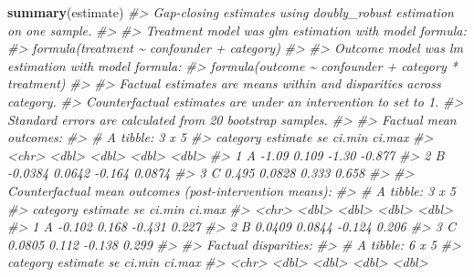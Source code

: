 \documentclass[
]{article}
\newenvironment{Shaded}{\begin{snugshade}}{\end{snugshade}}
\newcommand{\CommentTok}[1]{\textcolor[rgb]{0.56,0.35,0.01}{\textit{#1}}}
\newcommand{\FunctionTok}[1]{\textcolor[rgb]{0.13,0.29,0.53}{\textbf{#1}}}
\newcommand{\NormalTok}[1]{#1}
\begin{document}
\begin{Shaded}
\begin{Highlighting}[]
\FunctionTok{summary}\NormalTok{(estimate)}
\CommentTok{\#\textgreater{} Gap{-}closing estimates using doubly\_robust estimation on one sample.}
\CommentTok{\#\textgreater{} }
\CommentTok{\#\textgreater{} Treatment model was glm estimation with model formula:}
\CommentTok{\#\textgreater{} formula(treatment \textasciitilde{} confounder + category)}
\CommentTok{\#\textgreater{} }
\CommentTok{\#\textgreater{} Outcome model was lm estimation with model formula:}
\CommentTok{\#\textgreater{} formula(outcome \textasciitilde{} confounder + category * treatment)}
\CommentTok{\#\textgreater{} }
\CommentTok{\#\textgreater{} Factual estimates are means within and disparities across category.}
\CommentTok{\#\textgreater{} Counterfactual estimates are under an intervention to set  to 1.}
\CommentTok{\#\textgreater{} Standard errors are calculated from 20 bootstrap samples.}
\CommentTok{\#\textgreater{} }
\CommentTok{\#\textgreater{} Factual mean outcomes:}
\CommentTok{\#\textgreater{} \# A tibble: 3 x 5}
\CommentTok{\#\textgreater{}   category estimate     se ci.min  ci.max}
\CommentTok{\#\textgreater{}   \textless{}chr\textgreater{}       \textless{}dbl\textgreater{}  \textless{}dbl\textgreater{}  \textless{}dbl\textgreater{}   \textless{}dbl\textgreater{}}
\CommentTok{\#\textgreater{} 1 A         {-}1.09   0.109  {-}1.30  {-}0.877 }
\CommentTok{\#\textgreater{} 2 B         {-}0.0384 0.0642 {-}0.164  0.0874}
\CommentTok{\#\textgreater{} 3 C          0.495  0.0828  0.333  0.658 }
\CommentTok{\#\textgreater{} }
\CommentTok{\#\textgreater{} Counterfactual mean outcomes (post{-}intervention means):}
\CommentTok{\#\textgreater{} \# A tibble: 3 x 5}
\CommentTok{\#\textgreater{}   category estimate     se ci.min ci.max}
\CommentTok{\#\textgreater{}   \textless{}chr\textgreater{}       \textless{}dbl\textgreater{}  \textless{}dbl\textgreater{}  \textless{}dbl\textgreater{}  \textless{}dbl\textgreater{}}
\CommentTok{\#\textgreater{} 1 A         {-}0.102  0.168  {-}0.431  0.227}
\CommentTok{\#\textgreater{} 2 B          0.0409 0.0844 {-}0.124  0.206}
\CommentTok{\#\textgreater{} 3 C          0.0805 0.112  {-}0.138  0.299}
\CommentTok{\#\textgreater{} }
\CommentTok{\#\textgreater{} Factual disparities:}
\CommentTok{\#\textgreater{} \# A tibble: 6 x 5}
\CommentTok{\#\textgreater{}   category estimate    se ci.min ci.max}
\CommentTok{\#\textgreater{}   \textless{}chr\textgreater{}       \textless{}dbl\textgreater{} \textless{}dbl\textgreater{}  \textless{}dbl\textgreater{}  \textless{}dbl\textgreater{}}

\end{Highlighting}
\end{Shaded}
\end{document}
